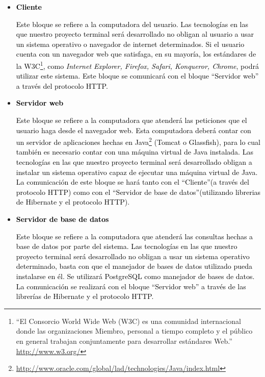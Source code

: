 \documentclass[11pt,letterpaper,titlepage]{article}
\begin{document}
\begin{itemize}
  \item \textcolor{black}{\textbf{Cliente}}

\textcolor{black}{Este bloque se refiere a la computadora del usuario. Las tecnolog\'ias en las que nuestro proyecto terminal ser\'a desarrollado no obligan al usuario a usar un sistema operativo o navegador de internet determinados. Si el usuario cuenta con un navegador web que satisfaga, en su mayor\'ia, los est\'andares de la W3C\footnote{``El Consorcio World Wide Web (W3C) es una comunidad internacional donde las organizaciones Miembro, personal a tiempo completo y el p\'ublico en general trabajan conjuntamente para desarrollar est\'andares Web.'' \href{http://www.w3.org/}{http://www.w3.org/}}, como \textit{Internet Explorer, Firefox, Safari, Konqueror, Chrome}, podr\'a utilizar este sistema. Este bloque se comunicar\'a con el bloque ``Servidor web'' a trav\'es del protocolo HTTP.}

  \item \textcolor{black}{\textbf{Servidor web}}

\textcolor{black}{Este bloque se refiere a la computadora que atender\'a las peticiones que el usuario haga desde el navegador web. Esta computadora deber\'a contar con un servidor de aplicaciones hechas en Java\footnote{\href{http://www.oracle.com/global/lad/technologies/Java/index.html}{http://www.oracle.com/global/lad/technologies/Java/index.html}}  (Tomcat o Glassfish), para lo cual tambi\'en es necesario contar con una m\'aquina virtual de Java instalada. Las tecnolog\'ias en las que nuestro proyecto terminal ser\'a desarrollado obligan a instalar un sistema operativo capaz de ejecutar una m\'aquina virtual de Java.  La comunicaci\'on de este bloque se har\'a tanto con el ``Cliente''(a trav\'es del protocolo HTTP) como con el ``Servidor de base de datos''(utilizando librerias de Hibernate y el protocolo HTTP).}

  \item \textcolor{black}{\textbf{Servidor de base de datos}}

\textcolor{black}{Este bloque se refiere a la computadora que atender\'a las consultas hechas a base de datos por parte del sistema. Las tecnolog\'ias en las que nuestro proyecto terminal ser\'a desarrollado no obligan a usar un sistema operativo determinado, basta con que el manejador de bases de datos utilizado pueda instalarse en \'el. Se utilizar\'a PostgreSQL como manejador de bases de datos. La comunicaci\'on se realizar\'a con el bloque ``Servidor web'' a trav\'es de las librer\'ias de Hibernate y el protocolo HTTP. }

\end{itemize}
\end{document}
